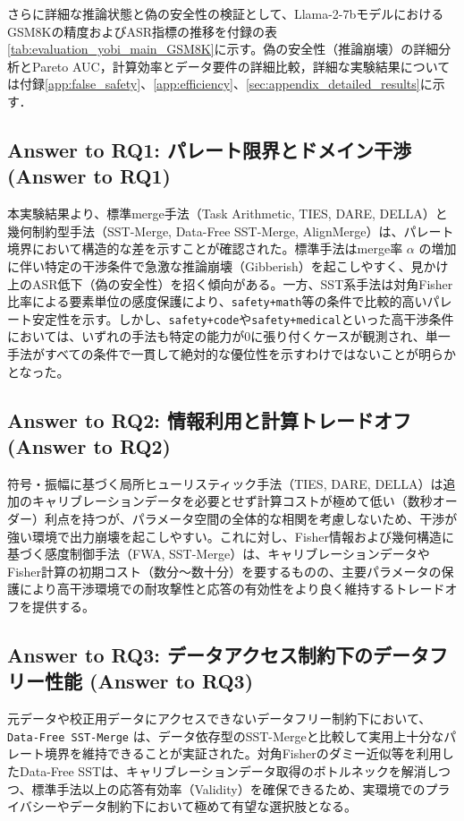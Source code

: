 \documentclass{article}
\begin{document}
さらに詳細な推論状態と偽の安全性の検証として、Llama-2-7bモデルにおけるGSM8Kの精度およびASR指標の推移を付録の表\ref{tab:evaluation_yobi_main_GSM8K}に示す。偽の安全性（推論崩壊）の詳細分析とPareto AUC，計算効率とデータ要件の詳細比較，詳細な実験結果については付録\ref{app:false_safety}、\ref{app:efficiency}、\ref{sec:appendix_detailed_results}に示す．

\subsection{Answer to RQ1: パレート限界とドメイン干渉 (Answer to RQ1)}
本実験結果より、標準merge手法（Task Arithmetic, TIES, DARE, DELLA）と幾何制約型手法（SST-Merge, Data-Free SST-Merge, AlignMerge）は、パレート境界において構造的な差を示すことが確認された。標準手法はmerge率 $\alpha$ の増加に伴い特定の干渉条件で急激な推論崩壊（Gibberish）を起こしやすく、見かけ上のASR低下（偽の安全性）を招く傾向がある。一方、SST系手法は対角Fisher比率による要素単位の感度保護により、\texttt{safety+math}等の条件で比較的高いパレート安定性を示す。しかし、\texttt{safety+code}や\texttt{safety+medical}といった高干渉条件においては、いずれの手法も特定の能力が0に張り付くケースが観測され、単一手法がすべての条件で一貫して絶対的な優位性を示すわけではないことが明らかとなった。

\subsection{Answer to RQ2: 情報利用と計算トレードオフ (Answer to RQ2)}
符号・振幅に基づく局所ヒューリスティック手法（TIES, DARE, DELLA）は追加のキャリブレーションデータを必要とせず計算コストが極めて低い（数秒オーダー）利点を持つが、パラメータ空間の全体的な相関を考慮しないため、干渉が強い環境で出力崩壊を起こしやすい。これに対し、Fisher情報および幾何構造に基づく感度制御手法（FWA, SST-Merge）は、キャリブレーションデータやFisher計算の初期コスト（数分〜数十分）を要するものの、主要パラメータの保護により高干渉環境での耐攻撃性と応答の有効性をより良く維持するトレードオフを提供する。

\subsection{Answer to RQ3: データアクセス制約下のデータフリー性能 (Answer to RQ3)}
元データや校正用データにアクセスできないデータフリー制約下において、\texttt{Data-Free SST-Merge} は、データ依存型のSST-Mergeと比較して実用上十分なパレート境界を維持できることが実証された。対角Fisherのダミー近似等を利用したData-Free SSTは、キャリブレーションデータ取得のボトルネックを解消しつつ、標準手法以上の応答有効率（Validity）を確保できるため、実環境でのプライバシーやデータ制約下において極めて有望な選択肢となる。
\end{document}

